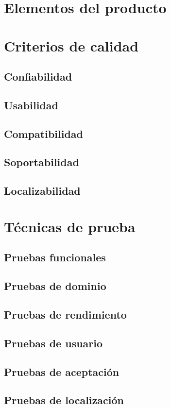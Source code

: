 \section{Elementos del producto}
\section{Criterios de calidad}
\subsection{Confiabilidad}
\subsection{Usabilidad}
\subsection{Compatibilidad}
\subsection{Soportabilidad}
\subsection{Localizabilidad}
\section{Técnicas de prueba}
\subsection{Pruebas funcionales}
\subsection{Pruebas de dominio}
\subsection{Pruebas de rendimiento}
\subsection{Pruebas de usuario}
\subsection{Pruebas de aceptación}
\subsection{Pruebas de localización}

